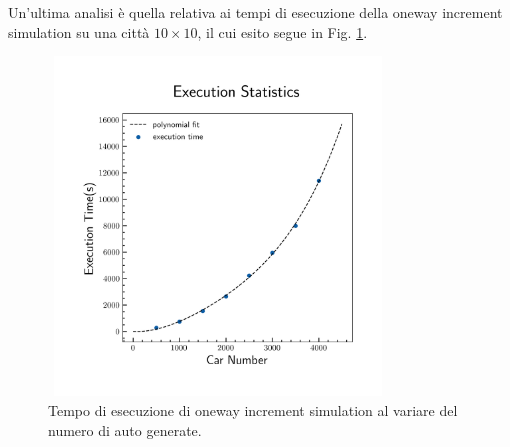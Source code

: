 \documentclass[main.tex]{subfiles}
\begin{document}
        Un'ultima analisi è quella relativa ai tempi di esecuzione della oneway increment simulation su una città $10 \times 10$, il cui esito segue in Fig. \ref{fig:10}.

        \begin{figure}[H]
            \centering
            \includegraphics[width=9cm, height=9cm]{execution_time.png}
            \caption{Tempo di esecuzione di oneway increment simulation al variare del numero di auto generate.}
            \label{fig:10}
        \end{figure}



    
\end{document}

